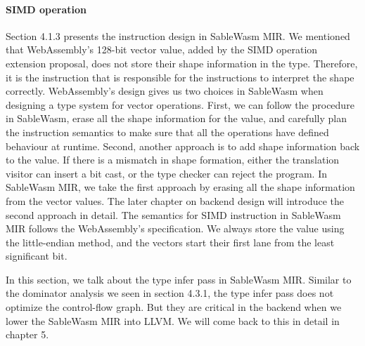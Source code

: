 \paragraph{SIMD operation}
Section 4.1.3 presents the instruction design in SableWasm MIR. We mentioned that WebAssembly's 128-bit vector value, added by the SIMD operation extension proposal, does not store their shape information in the type. Therefore, it is the instruction that is responsible for the instructions to interpret the shape correctly. WebAssembly's design gives us two choices in SableWasm when designing a type system for vector operations. First, we can follow the procedure in SableWasm, erase all the shape information for the value, and carefully plan the instruction semantics to make sure that all the operations have defined behaviour at runtime. Second, another approach is to add shape information back to the value. If there is a mismatch in shape formation, either the translation visitor can insert a bit cast, or the type checker can reject the program. In SableWasm MIR, we take the first approach by erasing all the shape information from the vector values. The later chapter on backend design will introduce the second approach in detail. The semantics for SIMD instruction in SableWasm MIR follows the WebAssembly's specification. We always store the value using the little-endian method, and the vectors start their first lane from the least significant bit.

In this section, we talk about the type infer pass in SableWasm MIR. Similar to the dominator analysis we seen in section 4.3.1, the type infer pass does not optimize the control-flow graph. But they are critical in the backend when we lower the SableWasm MIR into LLVM. We will come back to this in detail in chapter 5.